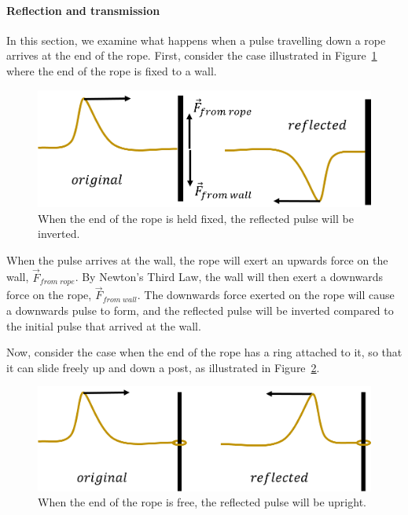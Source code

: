 \paragraph{Reflection and transmission}\label{subsec:waves:reflection}

In this section, we examine what happens when a pulse travelling down a rope arrives at the end of the rope. First, consider the case illustrated in Figure~\ref{fig:waves:reflectionfixed} where the end of the rope is fixed to a wall.

\begin{figure}[!htbp]
\centering
\includegraphics[width=0.7\linewidth]{files/reflectionfixed-d7f14aaeb523e5a462f490a2ba33146d.png}
\caption[]{When the end of the rope is held fixed, the reflected pulse will be inverted.}
\label{fig:waves:reflectionfixed}
\end{figure}

When the pulse arrives at the wall, the rope will exert an upwards force on the wall, $\vec F_{from\; rope}$. By Newton's Third Law, the wall will then exert a downwards force on the rope, $\vec F_{from\; wall}$. The downwards force exerted on the rope will cause a downwards pulse to form, and the reflected pulse will be inverted compared to the initial pulse that arrived at the wall.

Now, consider the case when the end of the rope has a ring attached to it, so that it can slide freely up and down a post, as illustrated in Figure~\ref{fig:waves:reflectionfree}.

\begin{figure}[!htbp]
\centering
\includegraphics[width=0.7\linewidth]{files/reflectionfree-24178e7e12fb7cac8d1acb9146619fb7.png}
\caption[]{When the end of the rope is free, the reflected pulse will be upright.}
\label{fig:waves:reflectionfree}
\end{figure}

